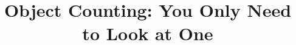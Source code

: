 \documentclass{article}
\begin{document}
\sloppy




\title{Object Counting: You Only Need to Look at One}
%
\address{\small School of Cyber Science and Engineering, Xi'an Jiaotong University, China\\
\small Emails: {linhuixjtu@gmail.com;  hongxiaopeng@ieee.org; iamwangyabin@stu.xjtu.edu.cn}}


\maketitle
\end{document}
